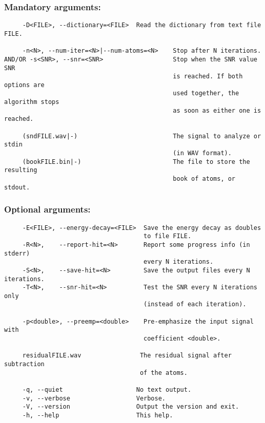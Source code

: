 \documentclass[11pt,a4paper]{article}
\begin{document}
\subsubsection*{Mandatory arguments:}
\begin{verbatim}
     -D<FILE>, --dictionary=<FILE>  Read the dictionary from text file FILE.

     -n<N>, --num-iter=<N>|--num-atoms=<N>    Stop after N iterations.
AND/OR -s<SNR>, --snr=<SNR>                   Stop when the SNR value SNR
                                              is reached. If both options are
                                              used together, the algorithm stops
                                              as soon as either one is reached.

     (sndFILE.wav|-)                          The signal to analyze or stdin
                                              (in WAV format).
     (bookFILE.bin|-)                         The file to store the resulting
                                              book of atoms, or stdout.
\end{verbatim}

\subsubsection*{Optional arguments:}
\begin{verbatim}
     -E<FILE>, --energy-decay=<FILE>  Save the energy decay as doubles
                                      to file FILE.
     -R<N>,    --report-hit=<N>       Report some progress info (in stderr)
                                      every N iterations.
     -S<N>,    --save-hit=<N>         Save the output files every N iterations.
     -T<N>,    --snr-hit=<N>          Test the SNR every N iterations only
                                      (instead of each iteration).

     -p<double>, --preemp=<double>    Pre-emphasize the input signal with
                                      coefficient <double>.

     residualFILE.wav                The residual signal after subtraction
                                     of the atoms.

     -q, --quiet                    No text output.
     -v, --verbose                  Verbose.
     -V, --version                  Output the version and exit.
     -h, --help                     This help.
\end{verbatim}
\end{document}
